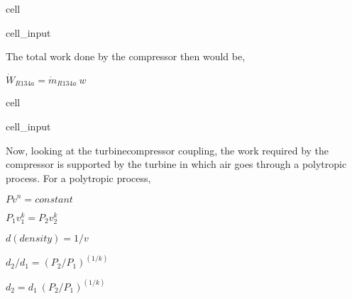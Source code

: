 \documentclass[letterpaper,10pt,english]{jupyterBook}
\begin{document}
\begin{sphinxuseclass}{cell}\begin{sphinxVerbatimInput}

\begin{sphinxuseclass}{cell_input}
\begin{sphinxVerbatim}[commandchars=\\\{\}]
      
       
\end{sphinxVerbatim}

\end{sphinxuseclass}\end{sphinxVerbatimInput}

\end{sphinxuseclass}
\sphinxAtStartPar
The total work done by the compressor then would be,

\sphinxAtStartPar
\(\dot W_{R134a}=\dot m_{R134a}\:w\)

\begin{sphinxuseclass}{cell}\begin{sphinxVerbatimInput}

\begin{sphinxuseclass}{cell_input}
\begin{sphinxVerbatim}[commandchars=\\\{\}]
       
\end{sphinxVerbatim}

\end{sphinxuseclass}\end{sphinxVerbatimInput}

\end{sphinxuseclass}
\sphinxAtStartPar
Now, looking at the turbine\sphinxhyphen{}compressor coupling, the work required by the compressor is supported by the turbine in which air goes through a polytropic process. For a polytropic process,

\sphinxAtStartPar
\(Pv^n=constant\)

\sphinxAtStartPar
\(P_1v_1^k=P_2v_2^k\)

\sphinxAtStartPar
\(d (density)=1/v\)

\sphinxAtStartPar
\(d_2/d_1=(P_2/P_1)^{(1/k)}\)

\sphinxAtStartPar
\(d_2=d_1\:(P_2/P_1)^{(1/k)}\)
\end{document}

